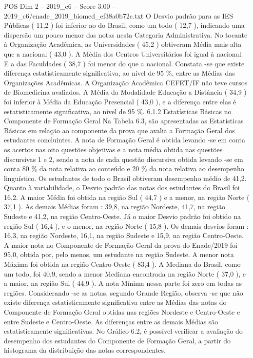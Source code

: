 \begin{textsample}{POS Dim 2 – 2019\_c6 – Score 3.00 – 2019\_c6/enade\_2019\_biomed\_ef38a0b72c.txt}
O Desvio padrão para as IES Públicas ( 11,2 ) foi inferior ao do Brasil, como um todo ( 12,7 ), indicando uma dispersão um pouco menor das notas nesta Categoria Administrativa.
No tocante à Organização Acadêmica, as Universidades ( 45,2 ) obtiveram Média mais alta que a nacional ( 43,0 ).
A Média dos Centros Universitários foi igual à nacional.
E a das Faculdades ( 38,7 ) foi menor do que a nacional.
Constata -se que existe diferença estatisticamente significativa, ao nível de 95 \%, entre as Médias das Organizações Acadêmicas.
A Organização Acadêmica CEFET/IF não teve cursos de Biomedicina avaliados.
A Média da Modalidade Educação a Distância ( 34,9 ) foi inferior à Média da Educação Presencial ( 43,0 ), e a diferença entre elas é estatisticamente significativa, ao nível de 95 \%. 6.1.2 Estatísticas Básicas no Componente de Formação Geral Na Tabela 6.3, são apresentadas as Estatísticas Básicas em relação ao componente da prova que avalia a Formação Geral dos estudantes concluintes.
A nota de Formação Geral é obtida levando -se em conta os acertos nas oito questões objetivas e a nota média obtida nas questões discursivas 1 e 2, sendo a nota de cada questão discursiva obtida levando -se em conta 80 \% da nota relativa ao conteúdo e 20 \% da nota relativa ao desempenho linguístico.
Os estudantes de todo o Brasil obtiveram desempenho médio de 41,2.
Quanto à variabilidade, o Desvio padrão das notas dos estudantes do Brasil foi 16,2.
A maior Média foi obtida na região Sul ( 44,7 ) e a menor, na região Norte ( 37,1 ).
As demais Médias foram : 39,8, na região Nordeste, 41,7, na região Sudeste e 41,2, na região Centro-Oeste.
Já o maior Desvio padrão foi obtido na região Sul ( 16,4 ), e o menor, na região Norte ( 15,8 ).
Os demais desvios foram : 16,3, na região Nordeste, 16,1, na região Sudeste e 15,9, na região Centro-Oeste.
A maior nota no Componente de Formação Geral da prova do Enade/2019 foi 95,0, obtida por, pelo menos, um estudante na região Sudeste.
A menor nota Máxima foi obtida na região Centro-Oeste ( 83,4 ).
A Mediana do Brasil, como um todo, foi 40,9, sendo a menor Mediana encontrada na região Norte ( 37,0 ), e a maior, na região Sul ( 44,9 ).
A nota Mínima nessa parte foi zero em todas as regiões.
Considerando -se as notas, segundo Grande Região, observa -se que não existe diferença estatisticamente significativa entre as Médias das notas do Componente de Formação Geral obtidas nas regiões Nordeste e Centro-Oeste e entre Sudeste e Centro-Oeste.
As diferenças entre as demais Médias são estatisticamente significativas.
No Gráfico 6.2, é possível verificar a avaliação do desempenho dos estudantes do Componente de Formação Geral, a partir do histograma da distribuição das notas correspondentes.

\end{textsample}
